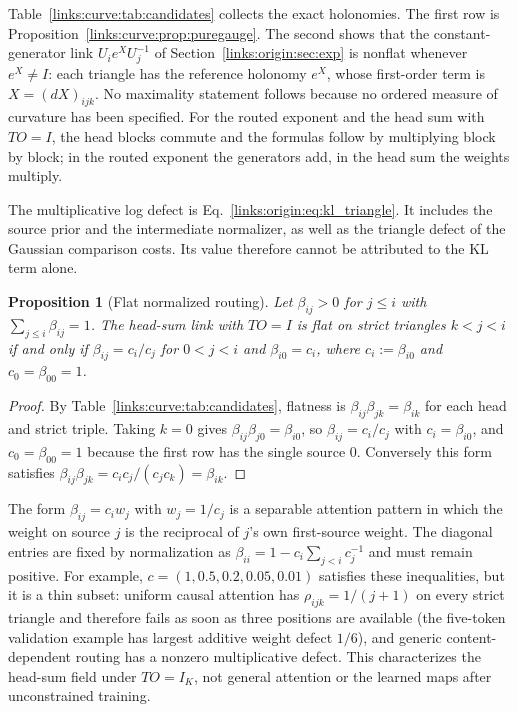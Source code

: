 \documentclass[11pt]{article}
\newtheorem{proposition}[theorem]{Proposition}
\theoremstyle{definition}
\theoremstyle{remark}
\begin{document}
Table~\ref{links:curve:tab:candidates} collects the exact holonomies. The first row is Proposition~\ref{links:curve:prop:puregauge}. The second shows that the constant-generator link $U_ie^XU_j^{-1}$ of Section~\ref{links:origin:sec:exp} is nonflat whenever $e^X\ne I$: each triangle has the reference holonomy $e^X$, whose first-order term is $X=(dX)_{ijk}$. No maximality statement follows because no ordered measure of curvature has been specified. For the routed exponent and the head sum with $TO=I$, the head blocks commute and the formulas follow by multiplying block by block; in the routed exponent the generators add, in the head sum the weights multiply.

The multiplicative log defect is Eq.~\eqref{links:origin:eq:kl_triangle}. It includes the source prior and the intermediate normalizer, as well as the triangle defect of the Gaussian comparison costs. Its value therefore cannot be attributed to the KL term alone.

\begin{proposition}[Flat normalized routing]
\label{links:curve:prop:flatrouting}
Let $\beta_{ij}>0$ for $j\le i$ with $\sum_{j\le i}\beta_{ij}=1$. The head-sum link with $TO=I$ is flat on strict triangles $k<j<i$ if and only if $\beta_{ij}=c_i/c_j$ for $0<j<i$ and $\beta_{i0}=c_i$, where $c_i:=\beta_{i0}$ and $c_0=\beta_{00}=1$.
\end{proposition}

\begin{proof}
By Table~\ref{links:curve:tab:candidates}, flatness is $\beta_{ij}\beta_{jk}=\beta_{ik}$ for each head and strict triple. Taking $k=0$ gives $\beta_{ij}\beta_{j0}=\beta_{i0}$, so $\beta_{ij}=c_i/c_j$ with $c_i=\beta_{i0}$, and $c_0=\beta_{00}=1$ because the first row has the single source $0$. Conversely this form satisfies $\beta_{ij}\beta_{jk}=c_ic_j/(c_jc_k)=\beta_{ik}$.
\end{proof}

The form $\beta_{ij}=c_iw_j$ with $w_j=1/c_j$ is a separable attention pattern in which the weight on source $j$ is the reciprocal of $j$'s own first-source weight. The diagonal entries are fixed by normalization as $\beta_{ii}=1-c_i\sum_{j<i}c_j^{-1}$ and must remain positive. For example, $c=(1,0.5,0.2,0.05,0.01)$ satisfies these inequalities, but it is a thin subset: uniform causal attention has $\rho_{ijk}=1/(j+1)$ on every strict triangle and therefore fails as soon as three positions are available (the five-token validation example has largest additive weight defect $1/6$), and generic content-dependent routing has a nonzero multiplicative defect. This characterizes the head-sum field under $TO=I_K$, not general attention or the learned maps after unconstrained training.
\end{document}
